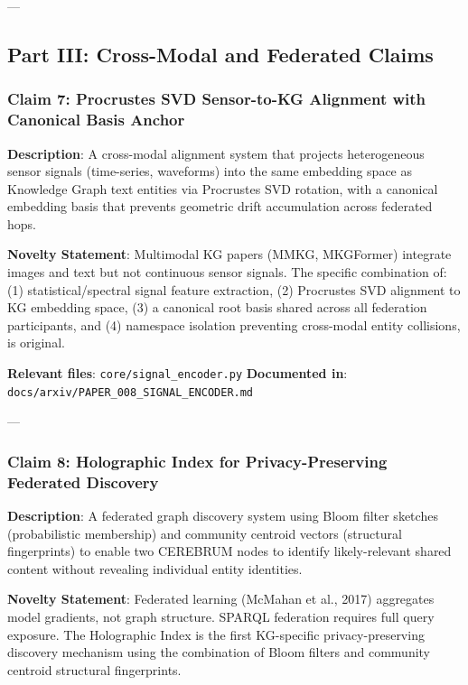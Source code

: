 \documentclass[10pt,journal,compsoc]{IEEEtran}
\begin{document}
---

\subsection{Part III: Cross-Modal and Federated Claims}

\subsubsection{Claim 7: Procrustes SVD Sensor-to-KG Alignment with Canonical Basis Anchor}

\textbf{Description}: A cross-modal alignment system that projects heter\-ogeneous sensor signals (time-series, waveforms) into the same embedding space as Knowledge Graph text entities via Procrustes SVD rotation, with a canonical embedding basis that prevents geometric drift accum\-ulation across federated hops.

\textbf{Novelty Statement}: Multimodal KG papers (MMKG, MKGFormer) integrate images and text but not continuous sensor signals. The specific combination of: (1) statistical/spectral signal feature extraction, (2) Procrustes SVD alignment to KG embedding space, (3) a canonical root basis shared across all federation parti\-cipants, and (4) namespace isolation preventing cross-modal entity collisions, is original.

\textbf{Relevant files}: \texttt{core/signal\_encoder.py}
\textbf{Documented in}: \texttt{docs/arxiv/PAPER\_008\_SIGNAL\_ENCODER.md}

---

\subsubsection{Claim 8: Holographic Index for Privacy-Preserving Federated Discovery}

\textbf{Description}: A federated graph discovery system using Bloom filter sketches (proba\-bilistic membership) and community centroid vectors (structural finge\-rprints) to enable two CEREBRUM nodes to identify likely-relevant shared content without revealing individual entity identities.

\textbf{Novelty Statement}: Federated learning (McMahan et al., 2017) aggregates model gradients, not graph structure. SPARQL federation requires full query exposure. The Holographic Index is the first KG-specific privacy-preserving discovery mechanism using the combination of Bloom filters and community centroid structural finge\-rprints.
\end{document}
